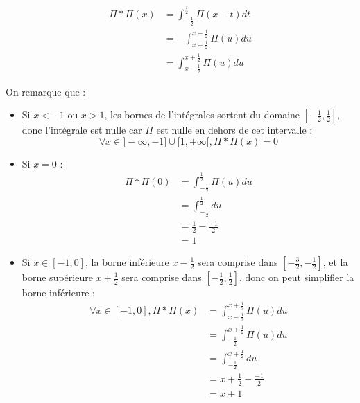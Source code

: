 \documentclass[12pt, a4paper]{article}
\begin{document}
\begin{equation*}
	\begin{aligned}
		\Pi * \Pi (x) & = \int_{-\frac{1}{2}}^{\frac{1}{2}} \Pi(x-t) dt \\
		{} & = -\int_{x+\frac{1}{2}}^{x-\frac{1}{2}} \Pi(u) du \\
		{} & = \int_{x-\frac{1}{2}}^{x+\frac{1}{2}} \Pi(u) du 
	\end{aligned}
\end{equation*}


\clearpage


On remarque que :

\begin{itemize}
	\item Si $x < -1$ ou $x > 1$, les bornes de l'intégrales sortent du domaine $\left[-\frac{1}{2}, \frac{1}{2}\right]$, donc l'intégrale est nulle car $\Pi$ est nulle en dehors de cet intervalle :
		\begin{equation*}
			\forall x \in ]-\infty, -1] \cup [1, +\infty[, \Pi * \Pi (x) = 0
		\end{equation*}
	\item Si $x = 0$ :
		\begin{equation*}
			\begin{aligned}
				\Pi * \Pi (0) & = \int_{-\frac{1}{2}}^{\frac{1}{2}} \Pi(u) du \\
				{} & = \int_{-\frac{1}{2}}^{\frac{1}{2}} du \\
				{} & = \frac{1}{2} - \frac{-1}{2} \\
				{} & = 1
			\end{aligned}
		\end{equation*}
	\item Si $x \in [-1, 0]$, la borne inférieure $x-\frac{1}{2}$ sera comprise dans $\left[ -\frac{3}{2}, -\frac{1}{2} \right]$, et la borne supérieure $x+\frac{1}{2}$ sera comprise dans $\left[ -\frac{1}{2}, \frac{1}{2} \right]$, donc on peut simplifier la borne inférieure :
		\begin{equation*}
			\begin{aligned}
				\forall x \in [-1, 0], \Pi * \Pi (x) & = \int_{x-\frac{1}{2}}^{x+\frac{1}{2}} \Pi(u) du \\
				{} & = \int_{-\frac{1}{2}}^{x+\frac{1}{2}} \Pi(u) du \\
				{} & = \int_{-\frac{1}{2}}^{x+\frac{1}{2}} du \\
				{} & = x + \frac{1}{2} - \frac{-1}{2} \\
				{} & = x + 1
			\end{aligned}

\end{equation*}
\end{itemize}
\end{document}
